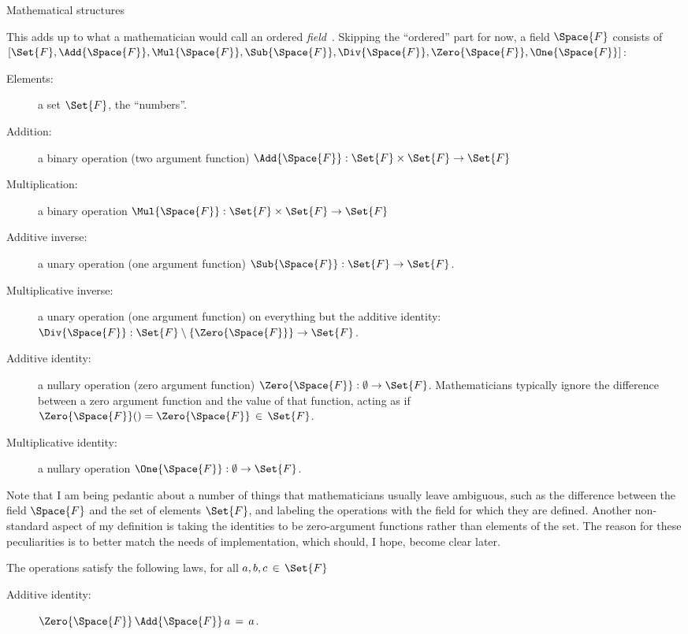 \documentclass[12pt]{PalisadesLakesBook}
\begin{document}
\begin{plSection}{Mathematical structures} 


This adds up to what a mathematician would call an ordered 
\emph{field}~\cite{wiki:FieldMathematics}.
Skipping the ``ordered'' part for now,
a field $\Space{F}$ consists of
$[\Set{F},\Add{\Space{F}},\Mul{\Space{F}},
\Sub{\Space{F}},\Div{\Space{F}},\Zero{\Space{F}}, \One{\Space{F}}]$:
\begin{description}
\item[Elements:] a set $\Set{F}$, the ``numbers''.
\item[Addition:] a binary operation (two argument function)
$\Add{\Space{F}} : \Set{F} \times \Set{F} \rightarrow \Set{F}$
\item[Multiplication:] a binary operation 
$\Mul{\Space{F}} : \Set{F} \times \Set{F} \rightarrow \Set{F}$
\item[Additive inverse:] a unary operation (one argument function)
$\Sub{\Space{F}} :\Set{F} \rightarrow \Set{F}$.
\item[Multiplicative inverse:] 
a unary operation (one argument function)
on everything but the additive identity:
$\Div{\Space{F}} :  \Set{F} \setminus \left\{\Zero{\Space{F}}\right\} 
\rightarrow \Set{F}$.
\item[Additive identity:] a nullary operation 
(zero argument function)
$\Zero{\Space{F}} : \emptyset \rightarrow \Set{F}$.
Mathematicians typically ignore the difference between a zero
argument function and the value of that function,
acting as if $\Zero{\Space{F}}() = \Zero{\Space{F}}\, \in \, \Set{F}$.
\item[Multiplicative identity:] a nullary operation 
$\One{\Space{F}} : \emptyset \rightarrow \Set{F}$.
\end{description}
Note that I am being pedantic about a number of things
that mathematicians usually leave ambiguous,
such as the difference between the field $\Space{F}$ 
and the set of elements $\Set{F}$,
and labeling the operations
with the field for which they are defined.
Another non-standard aspect of my definition is taking
the identities to be zero-argument functions rather than
elements of the set.
The reason for these peculiarities is to better match the needs 
of implementation, which should, I hope, 
become clear later.

The operations satisfy the following laws, for all 
$a, b, c \,\in \, \Set{F}$
\begin{description}

\item[Additive identity:] 
$\Zero{\Space{F}} \,\Add{\Space{F}}\, a \,=\, a$.


\end{description}
\end{plSection}
\end{document}
